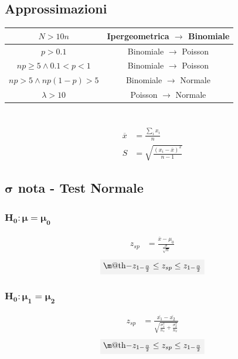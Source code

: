 \documentclass[fontsize=8pt]{scrartcl}
\makeatletter
\newcommand{\mysection}[1]{
    \setlength\fboxsep{4pt} %
    \section*{\colorbox{black}{\makebox[\linewidth][l]{\color{white}#1\hfill}}}
}
\newcommand*{\boxcolor}{light-gray}
\renewcommand{\boxed}[1]{
    \textcolor{\boxcolor}{%
        \tikz[baseline={([yshift=-1ex]current bounding box.center)}]
        \node [fill=light-gray, minimum width=1ex,draw]
        {\normalcolor\m@th$\displaystyle#1$};
    }
}
\makeatother
\begin{document}
\begin{multicols*}{2}
\subsection*{Approssimazioni}
\begin{center}
    \begin{tabular}{|c|c|}
        \hline
        \(N>10n\) & Ipergeometrica \(\rightarrow\) Binomiale\\\hline
        \(p>0.1\) & Binomiale \(\rightarrow\) Poisson\\\hline
        \(np \geq 5 \land  0.1<p<1\) & Binomiale \(\rightarrow\) Poisson\\\hline
        \(np > 5 \land np(1-p)>5\) & Binomiale \(\rightarrow\) Normale\\\hline
        \(\lambda > 10\) & Poisson \(\rightarrow\) Normale\\\hline
    \end{tabular}
\end{center}

\vfill\null
\columnbreak

\mysection{TEST MEDIA}
\begin{align*}
    \overline{x}&=\frac{\sum_ ix_i}{n}\\
    S&=\sqrt{\frac{(x_i-\overline{x})^2}{n-1}}
\end{align*}

\subsection*{\(\mathbf{\sigma}\) nota - Test Normale}

\subsubsection*{\(\mathbf{H_0:\mu=\mu_0}\)}

\begin{align*}
    z_{sp}&=\frac{\overline{x}-\mu_0}{\frac{\sigma}{\sqrt{n}}}
\end{align*}
\begin{equation*}
    \boxed{-z_{1-\frac{\alpha}{2}}\leq z_{sp} \leq z_{1-\frac{\alpha}{2}}}
\end{equation*}

\subsubsection*{\(\mathbf{H_0:\mu_1=\mu_2}\)}

\begin{align*}
    z_{sp}&=\frac{\overline{x_1}-\overline{x_2}}{\sqrt{\frac{\sigma_1^2}{n_1}+\frac{\sigma_2^2}{n_2}}}    
\end{align*}
\begin{equation*}
   \boxed{-z_{1-\frac{\alpha}{2}}\leq z_{sp} \leq z_{1-\frac{\alpha}{2}}}
\end{equation*}


\end{multicols*}
\end{document}
